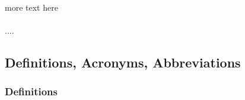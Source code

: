 \documentclass[english]{article}
\begin{document}
\paragraph{}
more text here

\paragraph{}
....

\newpage
\subsection{Definitions, Acronyms, Abbreviations}


\subsubsection{Definitions}
\end{document}
